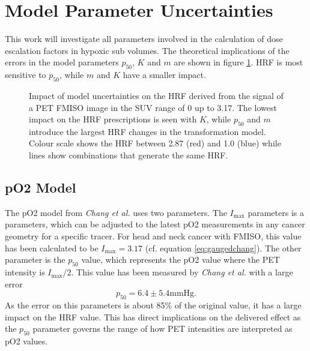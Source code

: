 \section{Model Parameter Uncertainties}
This work will investigate all parameters involved in the calculation of dose escalation factors in hypoxic sub volumes. The theoretical implications of the errors in the model parameters $p_{50}$, $K$ and $m$ are shown in figure \ref{fig:uncertaintyimpact}. HRF is most sensitive to $p_{50}$, while $m$ and $K$ have a smaller impact. 
\begin{figure}[p]
\centering
{}
\hspace{0.3cm}
\hspace{0.3cm}
\hspace{0.3cm}
\hspace{0.3cm}
\caption{Impact of model uncertainties on the HRF derived from the signal of a PET FMISO image in the SUV range of 0 up to 3.17. The lowest impact on the HRF prescriptions is seen with $K$, while $p_{50}$ and $m$ introduce the largest HRF changes in the transformation model. Colour scale shows the HRF between 2.87 (red) and 1.0 (blue) while lines show combinations that generate the same HRF.}
\label{fig:uncertaintyimpact}
\end{figure}
\subsection{pO2 Model}
The pO2 model from \textit{Chang et al.} \cite{pmid19994538} uses two parameters. The $I_\mathrm{max}$ parameters is a parameters, which can be adjusted to the latest pO2 measurements in any cancer geometry for a specific tracer. For head and neck cancer with FMISO, this value has been calculated to be $I_\mathrm{max}=3.17$ (cf. equation \ref{eq:gaugedchang}). The other parameter is the $p_{50}$ value, which represents the pO2 value where the PET intensity is $I_\mathrm{max}/2$. This value has been measured by \textit{Chang et al.}\cite{pmid19994538}  with a large error
\begin{equation}
p_\mathrm{50} = 6.4 \pm 5.4 \mathrm{mmHg}.
\end{equation}
As the error on this parameters is about 85\% of the original value, it has a large impact on the HRF value. This has direct implications on the delivered effect as the $p_{50}$ parameter governs the range of how PET intensities are interpreted as pO2 values.
